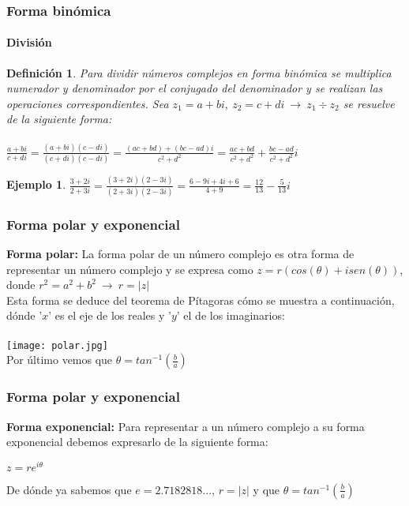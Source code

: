 \documentclass[11pt]{beamer}
\newtheorem{defi}{Definición}
\newtheorem{ejem}{Ejemplo}
\begin{document}
\begin{frame}
\frametitle{Forma binómica}
\framesubtitle{División}
\begin{defi}
Para dividir números complejos en forma binómica se multiplica numerador y denominador por el conjugado del denominador y se realizan las operaciones correspondientes. Sea $z_1 = a+bi,~z_2 = c+di~\rightarrow~z_1 \div z_2$ se resuelve de la siguiente forma: \\ \hspace{0cm} \\
$\frac{a+bi}{c+di} = \frac{(a+bi)(c-di)}{(c+di)(c-di)} = \frac{(ac+bd)+(bc-ad)i}{c^2+d^2} = \frac{ac+bd}{c^2+d^2}+\frac{bc-ad}{c^2+d^2}i$
\end{defi}
\begin{ejem}
$\frac{3+2i}{2+3i} = \frac{(3+2i)(2-3i)}{(2+3i)(2-3i)} = \frac{6-9i+4i+6}{4+9} = \frac{12}{13}-\frac{5}{13}i$
\end{ejem}
\end{frame}

\begin{frame}
\frametitle{Forma polar y exponencial}
\textbf{Forma polar: }
La forma polar de un número complejo es otra forma de representar un número complejo y se expresa como $z = r(cos(\theta) + isen(\theta))$, donde $r^2 = a^2+b^2~\rightarrow~r=|z|$\\
Esta forma se deduce del teorema de Pítagoras cómo se muestra a continuación, dónde '$x$' es el eje de los reales y '$y$' el de los imaginarios:\\ \hspace{0cm} \\
\texttt{[image: polar.jpg]}\\
Por último vemos que $\theta = tan^{-1}(\frac{b}{a})$ 
\end{frame}

\begin{frame}
\frametitle{Forma polar y exponencial}
\textbf{Forma exponencial: }
Para representar a un número complejo a su forma exponencial debemos expresarlo de la siguiente forma: \\
\begin{center}
$z = re^{i\theta}$\\
\end{center}
De dónde ya sabemos que $e = 2.7182818...$, $r = |z|$ y que $\theta = tan^{-1}(\frac{b}{a})$
\end{frame}
\end{document}

